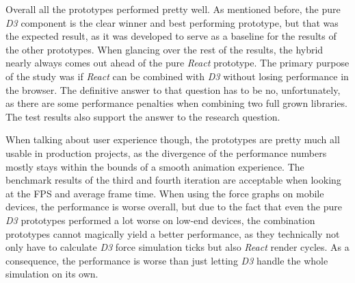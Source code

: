 Overall all the prototypes performed pretty well. As mentioned before, the pure \emph{D3} component is the clear winner and best performing prototype, but that was the expected result, as it was developed to serve as a baseline for the results of the other prototypes. When glancing over the rest of the results, the hybrid nearly always comes out ahead of the pure \emph{React} prototype. The primary purpose of the study was if \emph{React} can be combined with \emph{D3} without losing performance in the browser. The definitive answer to that question has to be no, unfortunately, as there are some performance penalties when combining two full grown libraries. The test results also support the answer to the research question.

When talking about user experience though, the prototypes are pretty much all usable in production projects, as the divergence of the performance numbers mostly stays within the bounds of a smooth animation experience. The benchmark results of the third and fourth iteration are acceptable when looking at the FPS and average frame time. When using the force graphs on mobile devices, the performance is worse overall, but due to the fact that even the pure \emph{D3} prototypes performed a lot worse on low-end devices, the combination prototypes cannot magically yield a better performance, as they technically not only have to calculate \emph{D3} force simulation ticks but also \emph{React} render cycles. As a consequence, the performance is worse than just letting \emph{D3} handle the whole simulation on its own. 

